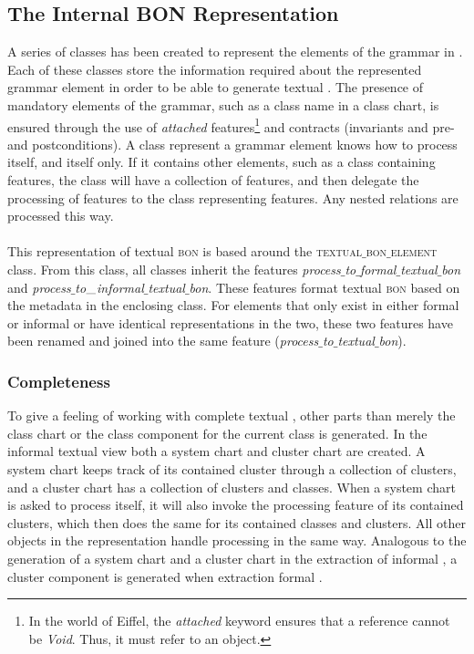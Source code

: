 \subsection{The Internal BON Representation}
A series of classes has been created to represent the elements of the \bon{} grammar in \cite{walden1995}. Each of these classes store the information required about the represented grammar element in order to be able to generate textual \bon{}. The presence of mandatory elements of the grammar, such as a class name in a class chart, is ensured through the use of  \textit{attached} features\footnote{In the world of Eiffel, the \textit{attached} keyword ensures that a reference cannot be \textit{Void}. Thus, it must refer to an object.} and contracts (invariants and pre- and postconditions). A class represent a grammar element knows how to process itself, and itself only. If it contains other elements, such as a class containing features, the class will have a collection of features, and then delegate the processing of features to the class representing features. Any nested relations are processed this way.

\paragraph{}
This representation of textual \textsc{bon} is based around the \textsc{textual$\_$bon$\_$element} class. From this class, all classes inherit the features \textit{process$\_$to$\_$formal$\_$textual$\_$bon} and  \textit{process$\_$to$\_\newline$informal$\_$textual$\_$bon}. These features format textual \textsc{bon} based on the metadata in the enclosing class. For elements that only exist in either formal or informal \bon{} or have identical representations in the two, these two features have been renamed and joined into the same feature (\textit{process$\_$to$\_$textual$\_$bon}).

\subsubsection{Completeness}
To give a feeling of working with complete textual \bon{}, other parts than merely the class chart or the class component for the current class is generated. In the informal textual \bon{ } view both a system chart and cluster chart are created. A system chart keeps track of its contained cluster through a collection of clusters, and a cluster chart has a collection of clusters and classes. When a system chart is asked to process itself, it will also invoke the processing feature of its contained clusters, which then does the same for its contained classes and clusters. All other objects in the \bon{} representation handle processing in the same way. Analogous to the generation of a system chart and a cluster chart in the extraction of informal \bon{}, a cluster component is generated when extraction formal \bon{}.

